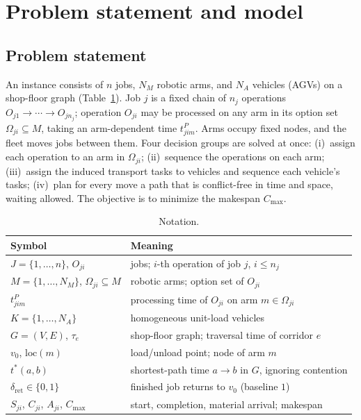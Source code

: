 \section{Problem statement and model}
\label{sec:Chapter_III}
\subsection{Problem statement}

An instance consists of $n$ jobs, $N_M$ robotic arms, and $N_A$ vehicles (AGVs) on a shop-floor graph (Table~\ref{tab:notation}).
Job $j$ is a fixed chain of $n_j$ operations $O_{j1}\to\cdots\to O_{jn_j}$; operation $O_{ji}$ may be processed on any arm in its option set $\Omega_{ji}\subseteq M$, taking an arm-dependent time $t^P_{jim}$.
Arms occupy fixed nodes, and the fleet moves jobs between them.
Four decision groups are solved at once:
(i)~assign each operation to an arm in $\Omega_{ji}$;
(ii)~sequence the operations on each arm;
(iii)~assign the induced transport tasks to vehicles and sequence each vehicle's tasks;
(iv)~plan for every move a path that is conflict-free in time and space, waiting allowed.
The objective is to minimize the makespan $C_{\max}$.

\begin{table}[t]
\caption{Notation.}
\label{tab:notation}
\footnotesize
\begin{tabular}{@{}ll@{}}
\toprule
Symbol & Meaning \\
\midrule
$J=\{1,\dots,n\}$, $O_{ji}$ & jobs; $i$-th operation of job $j$, $i\le n_j$ \\
$M=\{1,\dots,N_M\}$, $\Omega_{ji}\subseteq M$ & robotic arms; option set of $O_{ji}$ \\
$t^P_{jim}$ & processing time of $O_{ji}$ on arm $m\in\Omega_{ji}$ \\
$K=\{1,\dots,N_A\}$ & homogeneous unit-load vehicles \\
$G=(V,E)$, $\tau_e$ & shop-floor graph; traversal time of corridor $e$ \\
$v_0$, $\mathrm{loc}(m)$ & load/unload point; node of arm $m$ \\
$t^{*}(a,b)$ & shortest-path time $a\to b$ in $G$, ignoring contention \\
$\delta_{\mathrm{ret}}\in\{0,1\}$ & finished job returns to $v_0$ (baseline $1$) \\
$S_{ji}$, $C_{ji}$, $A_{ji}$, $C_{\max}$ & start, completion, material arrival; makespan \\
\bottomrule
\end{tabular}
\end{table}

